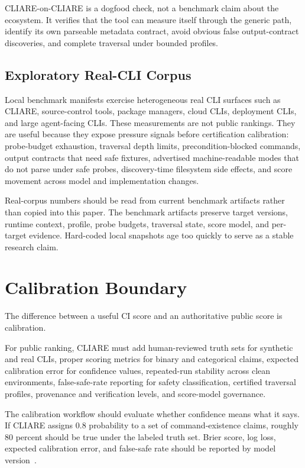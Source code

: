 \documentclass[11pt]{article}
\begin{document}
CLIARE-on-CLIARE is a dogfood check, not a benchmark claim about the ecosystem. It verifies that the tool can measure itself through the generic path, identify its own parseable metadata contract, avoid obvious false output-contract discoveries, and complete traversal under bounded profiles.

\subsection{Exploratory Real-CLI Corpus}

Local benchmark manifests exercise heterogeneous real CLI surfaces such as CLIARE, source-control tools, package managers, cloud CLIs, deployment CLIs, and large agent-facing CLIs. These measurements are not public rankings. They are useful because they expose pressure signals before certification calibration: probe-budget exhaustion, traversal depth limits, precondition-blocked commands, output contracts that need safe fixtures, advertised machine-readable modes that do not parse under safe probes, discovery-time filesystem side effects, and score movement across model and implementation changes.

Real-corpus numbers should be read from current benchmark artifacts rather than copied into this paper. The benchmark artifacts preserve target versions, runtime context, profile, probe budgets, traversal state, score model, and per-target evidence. Hard-coded local snapshots age too quickly to serve as a stable research claim.

\section{Calibration Boundary}

The difference between a useful CI score and an authoritative public score is calibration.

For public ranking, CLIARE must add human-reviewed truth sets for synthetic and real CLIs, proper scoring metrics for binary and categorical claims, expected calibration error for confidence values, repeated-run stability across clean environments, false-safe-rate reporting for safety classification, certified traversal profiles, provenance and verification levels, and score-model governance.

The calibration workflow should evaluate whether confidence means what it says. If CLIARE assigns 0.8 probability to a set of command-existence claims, roughly 80 percent should be true under the labeled truth set. Brier score, log loss, expected calibration error, and false-safe rate should be reported by model version~\cite{brier1950, gneiting2007, guo2017}.
\end{document}
